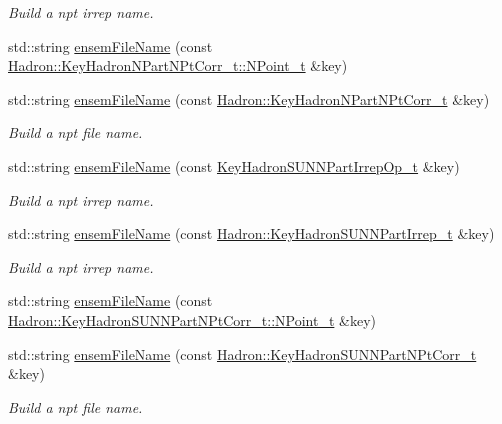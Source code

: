 \begin{DoxyCompactItemize}
\begin{DoxyCompactList}\small\item\em Build a npt irrep name. \end{DoxyCompactList}\item 
std\+::string \mbox{\hyperlink{namespaceHadron_ac1f8513c22ed958fc79537d0cfc00e1f}{ensem\+File\+Name}} (const \mbox{\hyperlink{structHadron_1_1KeyHadronNPartNPtCorr__t_1_1NPoint__t}{Hadron\+::\+Key\+Hadron\+N\+Part\+N\+Pt\+Corr\+\_\+t\+::\+N\+Point\+\_\+t}} \&key)
\item 
std\+::string \mbox{\hyperlink{namespaceHadron_a8e1d2864f30c4b930840948366f8f356}{ensem\+File\+Name}} (const \mbox{\hyperlink{structHadron_1_1KeyHadronNPartNPtCorr__t}{Hadron\+::\+Key\+Hadron\+N\+Part\+N\+Pt\+Corr\+\_\+t}} \&key)
\begin{DoxyCompactList}\small\item\em Build a npt file name. \end{DoxyCompactList}\item 
std\+::string \mbox{\hyperlink{namespaceHadron_abd79d5d930df3781c0e12f1335c4b86e}{ensem\+File\+Name}} (const \mbox{\hyperlink{structHadron_1_1KeyHadronSUNNPartIrrepOp__t}{Key\+Hadron\+S\+U\+N\+N\+Part\+Irrep\+Op\+\_\+t}} \&key)
\begin{DoxyCompactList}\small\item\em Build a npt irrep name. \end{DoxyCompactList}\item 
std\+::string \mbox{\hyperlink{namespaceHadron_a45ea107463dbd2ccf4ceae63b851f861}{ensem\+File\+Name}} (const \mbox{\hyperlink{structHadron_1_1KeyHadronSUNNPartIrrep__t}{Hadron\+::\+Key\+Hadron\+S\+U\+N\+N\+Part\+Irrep\+\_\+t}} \&key)
\begin{DoxyCompactList}\small\item\em Build a npt irrep name. \end{DoxyCompactList}\item 
std\+::string \mbox{\hyperlink{namespaceHadron_aa7a6f1af8bf69b8a63890e92bfaaf738}{ensem\+File\+Name}} (const \mbox{\hyperlink{structHadron_1_1KeyHadronSUNNPartNPtCorr__t_1_1NPoint__t}{Hadron\+::\+Key\+Hadron\+S\+U\+N\+N\+Part\+N\+Pt\+Corr\+\_\+t\+::\+N\+Point\+\_\+t}} \&key)
\item 
std\+::string \mbox{\hyperlink{namespaceHadron_a535351e28134f75011451a8b7b5f7cb4}{ensem\+File\+Name}} (const \mbox{\hyperlink{structHadron_1_1KeyHadronSUNNPartNPtCorr__t}{Hadron\+::\+Key\+Hadron\+S\+U\+N\+N\+Part\+N\+Pt\+Corr\+\_\+t}} \&key)
\begin{DoxyCompactList}\small\item\em Build a npt file name. \end{DoxyCompactList}\item 

\end{DoxyCompactItemize}
